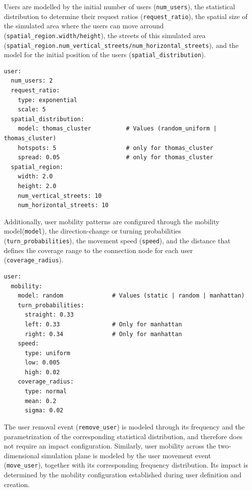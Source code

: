 \documentclass[ASNA]{USG} %
\begin{document}
\label{anex:userdefinition}

Users are modelled by the initial number of users (\texttt{num\_users}), the statistical distribution to determine their request ratios (\texttt{request\_ratio}), the spatial size of the simulated area where the users can move arround (\texttt{spatial\_region.width/height}), the streets of this simulated area (\texttt{spatial\_region.num\_vertical\_streets/num\_horizontal\_streets}), and the model for the initial position of the users (\texttt{spatial\_distribution}).


\begin{lstlisting}[caption={YAML configuration for users creation.},label=lst:user_event, basicstyle=\fontsize{8}{10}\selectfont\ttfamily]
user:
  num_users: 2
  request_ratio:
    type: exponential
    scale: 5
  spatial_distribution:
    model: thomas_cluster          # Values (random_uniform | thomas_cluster)
    hotspots: 5                    # only for thomas_cluster
    spread: 0.05                   # only for thomas_cluster
  spatial_region:
    width: 2.0
    height: 2.0
    num_vertical_streets: 10
    num_horizontal_streets: 10
\end{lstlisting}

Additionally, user mobility patterns are configured through the mobility model(\texttt{model}), the direction-change or turning probabilities (\texttt{turn\_probabilities}), the movement speed (\texttt{speed}), and the distance that defines the coverage range to the connection node for each user (\texttt{coverage\_radius}).


\begin{lstlisting}[caption={YAML configuration for the definition of the users mobility mode.},label=lst:user_event, basicstyle=\fontsize{8}{10}\selectfont\ttfamily]
user:
  mobility:
    model: random              # Values (static | random | manhattan)
    turn_probabilities:
      straight: 0.33
      left: 0.33               # Only for manhattan
      right: 0.34              # Only for manhattan
    speed:
      type: uniform
      low: 0.005
      high: 0.02
    coverage_radius:
      type: normal
      mean: 0.2
      sigma: 0.02
\end{lstlisting}  





\label{anex_userevents}

The user removal event (\texttt{remove\_user}) is modeled through its frequency and the parametrization of the corresponding statistical distribution, and therefore does not require an impact configuration. Similarly, user mobility across the two-dimensional simulation plane is modeled by the user movement event (\texttt{move\_user}), together with its corresponding frequency distribution. Its impact is determined by the mobility configuration established during user definition and creation.
\end{document}
